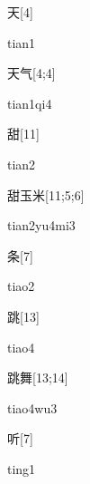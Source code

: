 \begin{verbete}[tian1]{天}[4]
\begin{pronuncia}{tian1}
\end{pronuncia}
\end{verbete}

\begin{verbete}[tian1qi4]{天气}[4;4]
\begin{pronuncia}{tian1qi4}
\end{pronuncia}
\end{verbete}

\begin{verbete}[tian2]{甜}[11]
\begin{pronuncia}{tian2}
\end{pronuncia}
\end{verbete}

\begin{verbete}[tian2yu4mi3]{甜玉米}[11;5;6]
\begin{pronuncia}{tian2yu4mi3}
\end{pronuncia}
\end{verbete}

\begin{verbete}[tiao2]{条}[7]
\begin{pronuncia}{tiao2}
\end{pronuncia}
\end{verbete}

\begin{verbete}[tiao4]{跳}[13]
\begin{pronuncia}{tiao4}
\end{pronuncia}
\end{verbete}

\begin{verbete}[tiao4wu3]{跳舞}[13;14]
\begin{pronuncia}{tiao4wu3}
\end{pronuncia}
\end{verbete}

\begin{verbete}[ting1]{听}[7]
\begin{pronuncia}{ting1}
\end{pronuncia}
\end{verbete}

